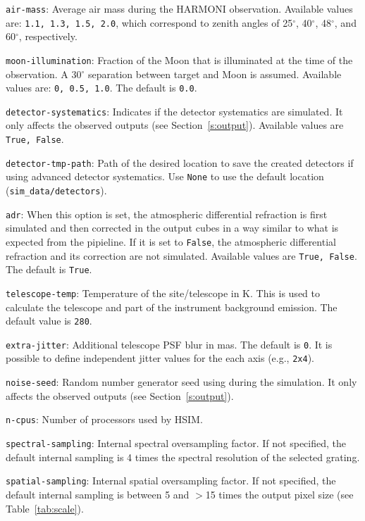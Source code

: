 \documentclass[12pt]{report}
\begin{document}
\begin{description}
\item \texttt{air-mass}: Average air mass during the HARMONI observation. Available values are: \texttt{1.1, 1.3, 1.5, 2.0}, which correspond to zenith angles of 25$^{\circ}$, 40$^{\circ}$, 48$^{\circ}$, and 60$^{\circ}$, respectively.

\item \texttt{moon-illumination}: Fraction of the Moon that is illuminated at the time of the observation. A 30$^{\circ}$ separation between target and Moon is assumed. Available values are: \texttt{0, 0.5, 1.0}. The default is \texttt{0.0}.

\item \texttt{detector-systematics}: Indicates if the detector systematics are simulated. It only affects the observed outputs (see Section~\ref{s:output}). Available values are \texttt{True, False}.

\item \texttt{detector-tmp-path}: Path of the desired location to save the created detectors if using advanced detector systematics. Use \texttt{None} to use the default location (\texttt{sim\_data/detectors}).

\item \texttt{adr}: When this option is set, the atmospheric differential refraction is first simulated and then corrected in the output cubes in a way similar to what is expected from the pipieline. If it is set to \texttt{False}, the atmospheric differential refraction and its correction are not simulated. Available values are \texttt{True, False}. The default is \texttt{True}.

\item \texttt{telescope-temp}: Temperature of the site\slash telescope in K. This is used to calculate the telescope and part of the instrument background emission. The default value is \texttt{280}.

\item \texttt{extra-jitter}: Additional telescope PSF blur in mas. The default is \texttt{0}. It is possible to define independent jitter values for the each axis (e.g., \texttt{2x4}).

\item \texttt{noise-seed}: Random number generator seed using during the simulation. It only affects the observed outputs (see Section~\ref{s:output}).

\item \texttt{n-cpus}: Number of processors used by HSIM.

\item \texttt{spectral-sampling}: Internal spectral oversampling factor. If not specified, the default internal sampling is 4 times the spectral resolution of the selected grating.

\item \texttt{spatial-sampling}: Internal spatial oversampling factor. If not specified, the default internal sampling is between 5 and $>$15 times the output pixel size (see Table~\ref{tab:scale}).

\end{description}
\end{document}
